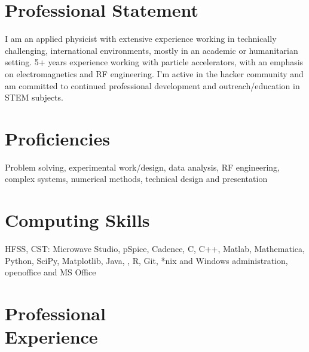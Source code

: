 \documentclass[margin,line]{resume}
\begin{document}
\begin{resume}
   \section{\mysidestyle Professional Statement}

    I am an applied physicist with extensive experience working in technically challenging, international environments, mostly in an academic or humanitarian setting. 5+ years experience working with particle accelerators, with an emphasis on electromagnetics and RF engineering. I'm active in the hacker community and am committed to continued professional development and outreach/education in STEM subjects.

    \section{\mysidestyle Proficiencies}

Problem solving, experimental work/design, data analysis, RF engineering, complex systems, numerical methods, technical design and presentation


    \section{\mysidestyle Computing Skills}

    HFSS, CST: Microwave Studio, pSpice, Cadence, C, C++, Matlab, Mathematica, Python, SciPy, Matplotlib, Java, \LaTeXe, R, Git, *nix and Windows administration, openoffice and MS Office

    \section{\mysidestyle Professional\\Experience}


\end{resume}
\end{document}
